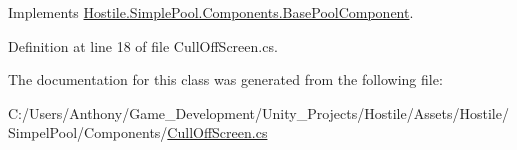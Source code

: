Implements \hyperlink{class_hostile_1_1_simple_pool_1_1_components_1_1_base_pool_component_ae79737959baf9cdf23d2bf77fc359cf7}{Hostile.\-Simple\-Pool.\-Components.\-Base\-Pool\-Component}.



Definition at line 18 of file Cull\-Off\-Screen.\-cs.



The documentation for this class was generated from the following file\-:\begin{DoxyCompactItemize}
\item 
C\-:/\-Users/\-Anthony/\-Game\-\_\-\-Development/\-Unity\-\_\-\-Projects/\-Hostile/\-Assets/\-Hostile/\-Simpel\-Pool/\-Components/\hyperlink{_cull_off_screen_8cs}{Cull\-Off\-Screen.\-cs}\end{DoxyCompactItemize}
